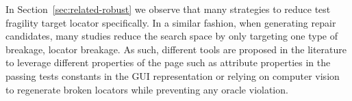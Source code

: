 In Section~\ref{sec:related-robust} we observe that many strategies to reduce test fragility target locator specifically. In a similar fashion, when generating repair candidates, many studies reduce the search space by only targeting one type of breakage, locator breakage. As such, different tools are proposed in the literature to leverage different properties of the page such as attribute properties in the passing tests\cite{Choudhary2011} constants in the GUI representation\cite{Kirinuki2019} or relying on computer vision\cite{Stocco2018} to regenerate broken locators while preventing any oracle violation.




